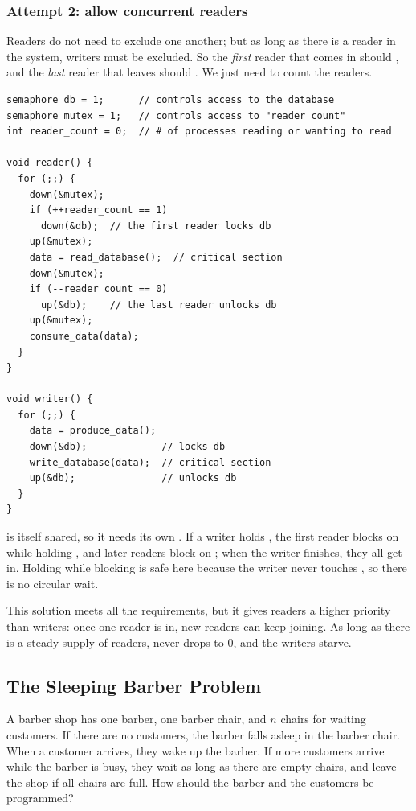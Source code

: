 \subsubsection{Attempt 2: allow concurrent readers}
Readers do not need to exclude one another; but as long as there is a reader in the system, writers must be excluded. So the \emph{first} reader that comes in should , and the \emph{last} reader that leaves should . We just need to count the readers.
\begin{lstlisting}
semaphore db = 1;      // controls access to the database
semaphore mutex = 1;   // controls access to "reader_count"
int reader_count = 0;  // # of processes reading or wanting to read

void reader() {
  for (;;) {
    down(&mutex);
    if (++reader_count == 1)
      down(&db);  // the first reader locks db
    up(&mutex);
    data = read_database();  // critical section
    down(&mutex);
    if (--reader_count == 0)
      up(&db);    // the last reader unlocks db
    up(&mutex);
    consume_data(data);
  }
}

void writer() {
  for (;;) {
    data = produce_data();
    down(&db);             // locks db
    write_database(data);  // critical section
    up(&db);               // unlocks db
  }
}
\end{lstlisting}
 is itself shared, so it needs its own . If a writer holds , the first reader blocks on  while holding , and later readers block on ; when the writer finishes, they all get in. Holding  while blocking is safe here because the writer never touches , so there is no circular wait.

This solution meets all the requirements, but it gives readers a higher priority than writers: once one reader is in, new readers can keep joining. As long as there is a steady supply of readers,  never drops to $0$, and the writers starve.

\subsection{The Sleeping Barber Problem}

\begin{definition}
  A barber shop has one barber, one barber chair, and $n$ chairs for waiting customers. If there are no customers, the barber falls asleep in the barber chair. When a customer arrives, they wake up the barber. If more customers arrive while the barber is busy, they wait as long as there are empty chairs, and leave the shop if all chairs are full. How should the barber and the customers be programmed?
\end{definition}

